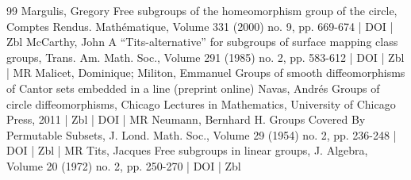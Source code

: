 \documentclass[10pt]{amsart}
\theoremstyle{definition}\newtheorem{defi}[theo]{Definition}\newtheorem{rema}[theo]{Remark}\newtheorem{exam}[theo]{Example}\newtheorem{exem}[theo]{Example}\newtheorem{nota}[theo]{Notation}
\begin{document}
\begin{thebibliography}{99}
 Margulis, Gregory Free subgroups of the homeomorphism group of the circle, Comptes Rendus. Mathématique, Volume 331 (2000) no. 9, pp. 669-674 | DOI | Zbl
 McCarthy, John A “Tits-alternative” for subgroups of surface mapping class groups, Trans. Am. Math. Soc., Volume 291 (1985) no. 2, pp. 583-612 | DOI | Zbl | MR
 Malicet, Dominique; Militon, Emmanuel Groups of smooth diffeomorphisms of Cantor sets embedded in a line (preprint online)
 Navas, Andrés Groups of circle diffeomorphisms, Chicago Lectures in Mathematics, University of Chicago Press, 2011 | Zbl | DOI | MR
 Neumann, Bernhard H. Groups Covered By Permutable Subsets, J. Lond. Math. Soc., Volume 29 (1954) no. 2, pp. 236-248 | DOI | Zbl | MR
 Tits, Jacques Free subgroups in linear groups, J. Algebra, Volume 20 (1972) no. 2, pp. 250-270 | DOI | Zbl
\end{thebibliography}
\end{document}
